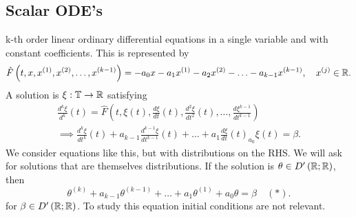 \subsection{Scalar ODE's}
k-th order linear ordinary differential equations in a single variable and  with constant coefficients. This is represented by  
\[
	\hat{F}\left( t, x ,x^{\left( 1 \right) }, x^{\left( 2 \right) }, \ldots, x^{\left( k - 1 \right) } \right) = -a_0 x - a_1 x^{\left( 1 \right) } - a_2 x^{\left( 2 \right) } - \ldots - a_{k -1} x^{\left( k - 1 \right) } , \quad x^{\left(j \right)} \in  \mathbb{R}
.\] 
A solution is $\xi : \mathbb{T} \to \mathbb{R}$ satisfying 
\begin{align*} %
	\frac{d ^{k} \xi}{d  ^{k}} \left( t  \right) = \hat{F}\left( t, \xi\left( t  \right) , \frac{d \xi}{d t} \left( t \right) , \frac{d ^{2}\xi}{d t ^2} \left( t \right) , \ldots, \frac{d \xi^{k - 1}}{d t ^{k - 1}}  \right)\\
		\implies\frac{d ^{k} \xi}{d t ^{k}} \left( t  \right) + a_{k - 1}\frac{d ^{k - 1}\xi}{d t ^{k -1}}\left( t \right) + \ldots + a_1 \frac{d \xi}{d t} \left( t \right) _ a_0 \xi\left( t \right)  = \beta 
.\end{align*}
We consider equations like this, but with distributions on the RHS. We will ask for solutions that are themselves distributions. If the solution is $\theta \in  D ' \left( \mathbb{R}; \mathbb{R} \right) $, then 
\[
	\theta ^{\left( k \right) } + a_{k - 1} \theta ^{\left( k - 1 \right) } + \ldots + a_1 \theta ^{\left( 1 \right) } + a_0 \theta = \beta \quad \left( * \right) 
.\] 
for $\beta \in  D'\left( \mathbb{R}; \mathbb{R} \right) $. To study this equation initial conditions are not relevant. 

